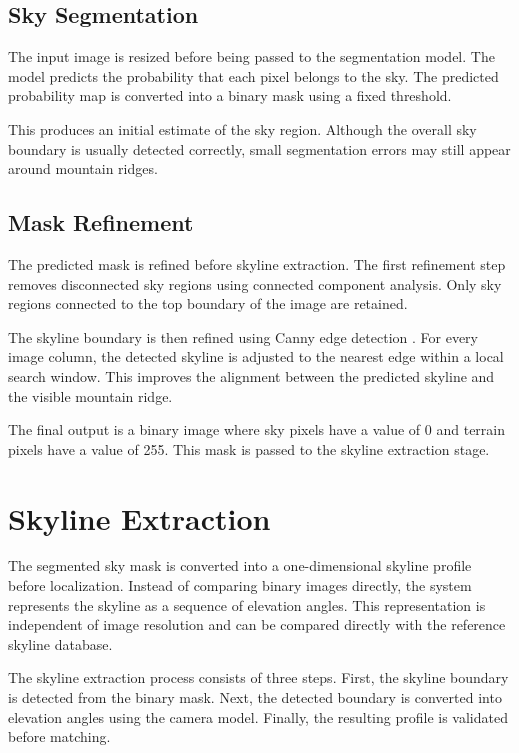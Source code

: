 \subsection{Sky Segmentation}

The input image is resized before being passed to the segmentation model. The model predicts the probability that each pixel belongs to the sky. The predicted probability map is converted into a binary mask using a fixed threshold.

This produces an initial estimate of the sky region. Although the overall sky boundary is usually detected correctly, small segmentation errors may still appear around mountain ridges.

\subsection{Mask Refinement}

The predicted mask is refined before skyline extraction. The first refinement step removes disconnected sky regions using connected component analysis. Only sky regions connected to the top boundary of the image are retained.

The skyline boundary is then refined using Canny edge detection \cite{canny1986edge}. For every image column, the detected skyline is adjusted to the nearest edge within a local search window. This improves the alignment between the predicted skyline and the visible mountain ridge.

The final output is a binary image where sky pixels have a value of 0 and terrain pixels have a value of 255. This mask is passed to the skyline extraction stage.

\section{Skyline Extraction}

The segmented sky mask is converted into a one-dimensional skyline profile before localization. Instead of comparing binary images directly, the system represents the skyline as a sequence of elevation angles. This representation is independent of image resolution and can be compared directly with the reference skyline database.

The skyline extraction process consists of three steps. First, the skyline boundary is detected from the binary mask. Next, the detected boundary is converted into elevation angles using the camera model. Finally, the resulting profile is validated before matching.

